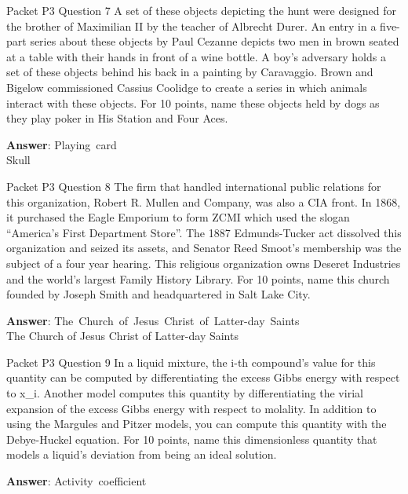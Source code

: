 \begin{frame}{Packet P3 Question 7}
A set of these objects depicting the hunt were designed for the brother of Maximilian II by the teacher of Albrecht Durer. An entry in a five-part series about these objects by Paul Cezanne depicts two   men in brown seated at a table with their hands in front of a wine bottle. A boy's   adversary holds a set of these objects behind his back in a painting by Caravaggio. Brown and Bigelow   commissioned Cassius Coolidge to create a series in which animals interact with these objects. For 10 points, name these objects held by dogs as they play poker in His Station and Four Aces.  

\textbf{Answer}: Playing\ card\\
 Skull
\end{frame}

\begin{frame}{Packet P3 Question 8}
The firm that handled international public relations for this organization, Robert R. Mullen and Company, was also a CIA front.  In 1868, it purchased the Eagle Emporium to form ZCMI which used the slogan ``America's First Department Store''.   The 1887 Edmunds-Tucker act dissolved this organization and seized its assets, and Senator Reed Smoot's membership was the subject of a four year hearing.  This religious organization owns Deseret Industries and the world's largest Family History Library.  For 10 points, name this church founded by Joseph Smith and headquartered   in Salt     Lake City.   

\textbf{Answer}: The\ Church\ of\ Jesus\ Christ\ of\ Latter-day\ Saints\\
 The Church of Jesus Christ of Latter-day Saints
\end{frame}

\begin{frame}{Packet P3 Question 9}
In a liquid mixture, the i-th compound's value for this quantity can be computed by differentiating the excess Gibbs energy with respect to x\_i. Another model computes this quantity by differentiating the virial expansion   of the excess Gibbs   energy with respect to molality. In addition to using the Margules and Pitzer models, you can compute this quantity with the Debye-Huckel equation. For 10 points,   name this dimensionless quantity that   models a liquid's deviation from being an ideal solution.

\textbf{Answer}: Activity\ coefficient\\
\end{frame}

